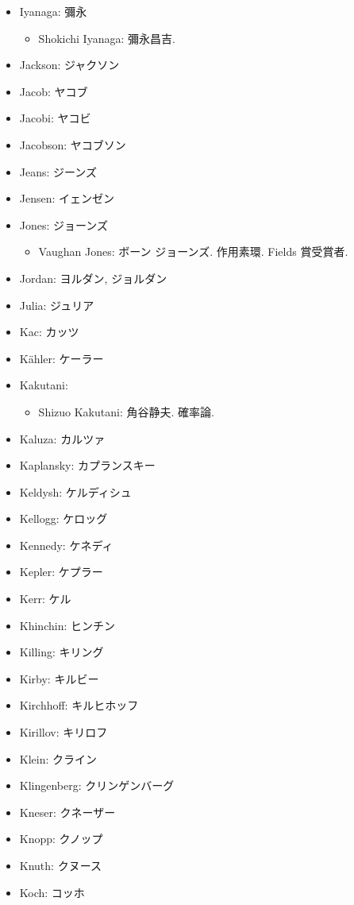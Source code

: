 \documentclass[openany, a4paper, oneside]{jsbook}
\begin{document}
\begin{itemize}
\begin{itemize}
\end{itemize}
\item Iyanaga: 彌永
\begin{itemize}
\item Shokichi Iyanaga: 彌永昌吉.
\end{itemize}
\item Jackson: ジャクソン
\item Jacob: ヤコブ
\item Jacobi: ヤコビ
\item Jacobson: ヤコブソン
\item Jeans: ジーンズ
\item Jensen: イェンゼン
\item Jones: ジョーンズ
\begin{itemize}
\item Vaughan Jones: ボーン ジョーンズ. 作用素環. Fields 賞受賞者.
\end{itemize}
\item Jordan: ヨルダン, ジョルダン
\item Julia: ジュリア
\item Kac: カッツ
\item K\"ahler: ケーラー
\item Kakutani:
\begin{itemize}
\item Shizuo Kakutani: 角谷静夫. 確率論.
\end{itemize}
\item Kaluza: カルツァ
\item Kaplansky: カプランスキー
\item Keldysh: ケルディシュ
\item Kellogg: ケロッグ
\item Kennedy: ケネディ
\item Kepler: ケプラー
\item Kerr: ケル
\item Khinchin: ヒンチン
\item Killing: キリング
\item Kirby: キルビー
\item Kirchhoff: キルヒホッフ
\item Kirillov: キリロフ
\item Klein: クライン
\item Klingenberg: クリンゲンバーグ
\item Kneser: クネーザー
\item Knopp: クノップ
\item Knuth: クヌース
\item Koch: コッホ

\end{itemize}
\end{document}
